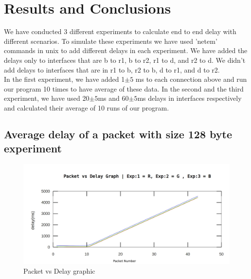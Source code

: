 \documentclass[12pt,journal,compsoc]{IEEEtran}
\begin{document}
\section{Results and Conclusions}

We have conducted 3 different experiments to calculate end to end delay with different scenarios. To simulate these experiments we have used 'netem' commands in unix to add different delays in each experiment. We have added the delays only to interfaces that are b to r1, b to r2, r1 to d, and r2 to d. We didn't add delays to interfaces that are in r1 to b, r2 to b, d to r1, and d to r2.\\
In the first experiment, we have added 1$\pm 5$ ms to each connection above and run our program 10 times to have average of these data. In the second and the third experiment, we have used 20$\pm 5$ms and 60$\pm 5$ms delays in interfaces respectively and calculated their average of 10 runs of our program.

\subsection{Average delay of a packet with size 128 byte experiment}

\begin{figure}[h!]
\centering
\captionsetup{justification=centering}
\includegraphics[width = \linewidth]{slope103.jpeg}
\caption{Packet vs Delay graphic}
\label{fig:slope103}
\end{figure}
\end{document}
